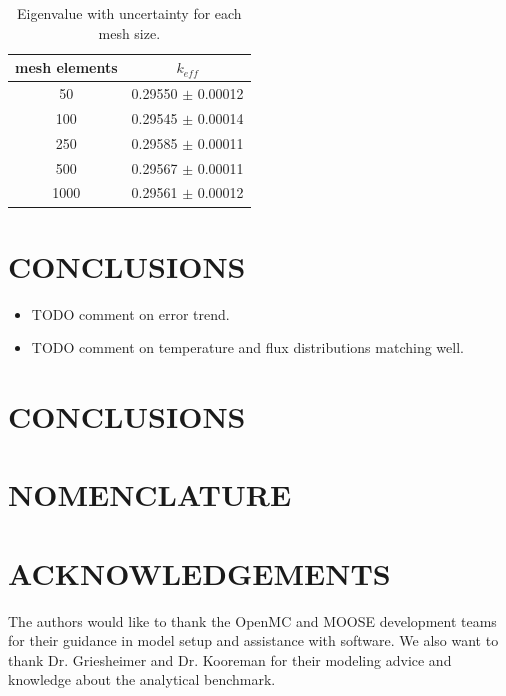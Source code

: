 \documentclass[letterpaper]{mc2023}
\begin{document}
\begin{table}[H]
    \centering
    \caption{Eigenvalue with uncertainty for each mesh size.}
    \begin{tabular}{c|c}
        \textbf{mesh elements} & $k_{eff}$ \\
        \hline
        50 & 0.29550 $\pm$ 0.00012 \\
        100 & 0.29545 $\pm$ 0.00014 \\
        250 & 0.29585  $\pm$ 0.00011 \\
        500 & 0.29567 $\pm$ 0.00011 \\
        1000 & 0.29561 $\pm$ 0.00012
    \end{tabular}
    \label{tab:data}
\end{table}


\section{CONCLUSIONS}\label{sec:conclusions}

\begin{itemize}
    \item TODO comment on error trend.
    \item TODO comment on temperature and flux distributions matching well.
\end{itemize}


\section{CONCLUSIONS}


\section*{NOMENCLATURE}

\printglossary[title={Nomenclature}, nonumberlist, nopostdot]

\section*{ACKNOWLEDGEMENTS}
The authors would like to thank the OpenMC and MOOSE development teams for their guidance in model setup and assistance
with software. We also want to thank Dr. Griesheimer and Dr. Kooreman for their modeling advice and knowledge about the
analytical benchmark.

\setlength{\baselineskip}{12pt}


\setlength{\baselineskip}{12pt}
\end{document}
